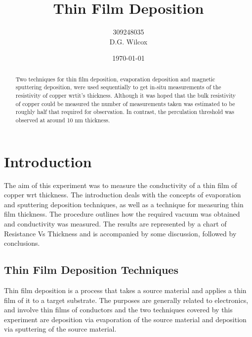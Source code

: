 \documentclass[aps,prl,twocolumn,groupedaddress,showkeys]{revtex4}
\begin{document}
\title{Thin Film Deposition}
\author{309248035 \\
				D.G. Wilcox}

\noaffiliation{}

\date{\today}

\begin{abstract}
Two techniques for thin film deposition, evaporation deposition and magnetic sputtering deposition, were used sequentially to get in-situ measurements of the resistivity of copper wrtit's thickness. Although it was hoped that the bulk resistivity of copper could be measured the number of measurements taken was estimated to be roughly half that required for observation. In contrast, the perculation threshold was observed at around 10 nm thickness.
\end{abstract}



\maketitle


\section{Introduction}

The aim of this experiment was to measure the conductivity of a thin film of copper wrt thickness. The introduction deals with the concepts of evaporation and sputtering deposition techniques, as well as a technique for measuring thin film thickness. The procedure outlines how the required vacuum was obtained and conductivity was measured. The results are represented by a chart of Resistance Vs Thickness and is accompanied by some discussion, followed by conclusions.

\subsection{Thin Film Deposition Techniques}

Thin film deposition is a process that takes a source material and applies a thin film of it to a target substrate. The purposes are generally related to electronics, and involve thin films of conductors and the two techniques covered by this experiment are deposition via evaporation of the source material and deposition via sputtering of the source material.
\end{document}
